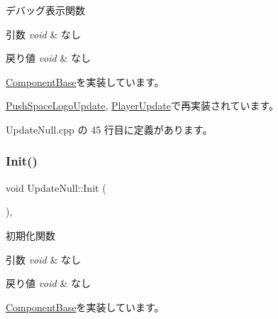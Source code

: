 デバッグ表示関数 


\begin{DoxyParams}{引数}
{\em void} & なし \\
\hline
\end{DoxyParams}

\begin{DoxyRetVals}{戻り値}
{\em void} & なし \\
\hline
\end{DoxyRetVals}


\mbox{\hyperlink{class_component_base_a36ae7d27ad9d756fa245bad443020407}{Component\+Base}}を実装しています。



\mbox{\hyperlink{class_push_space_logo_update_ab18a0c905455da17f9e2f1fe5f0c34e6}{Push\+Space\+Logo\+Update}}, \mbox{\hyperlink{class_player_update_ac15fd0faf356c6e66f6c62c2b6b8d3ac}{Player\+Update}}で再実装されています。



 Update\+Null.\+cpp の 45 行目に定義があります。

\mbox{\label{class_update_null_aaa8f5fe1f03e252ad75eb8c888a5bf46}} 
\subsubsection{\texorpdfstring{Init()}{Init()}}
{\footnotesize\ttfamily void Update\+Null\+::\+Init (\begin{DoxyParamCaption}{ }\end{DoxyParamCaption})\hspace{0.3cm}{\ttfamily [override]}, {\ttfamily [virtual]}}



初期化関数 


\begin{DoxyParams}{引数}
{\em void} & なし \\
\hline
\end{DoxyParams}

\begin{DoxyRetVals}{戻り値}
{\em void} & なし \\
\hline
\end{DoxyRetVals}


\mbox{\hyperlink{class_component_base_a125939d6befe42f28886a6523e86b18b}{Component\+Base}}を実装しています。



